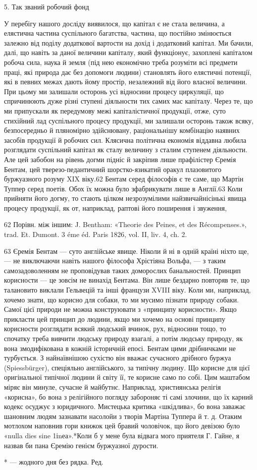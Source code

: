 5. Так званий робочий фонд

У перебігу нашого досліду виявилося, що капітал є не стала
величина, а елястична частина суспільного багатства, частина,
що постійно змінюється залежно від поділу додаткової вартости
на дохід і додатковий капітал. Ми бачили, далі, що навіть за
даної величини капіталу, який функціонує, захоплені капіталом
робоча сила, наука й земля (під нею економічно треба розуміти
всі предмети праці, які природа дає без допомоги людини) становлять
його елястичні потенції, які в певних межах дають йому
простір, незалежний від його власної величини. При цьому ми
залишали осторонь усі відносини процесу циркуляції, що спричинюють
дуже різні ступені діяльности тих самих мас капіталу.
Через те, що ми припускали як передумову межі капіталістичної
продукції, отже, суто стихійний лад суспільного процесу продукції,
ми залишали осторонь також всяку, безпосередньо й пляномірно
здійснювану, раціональнішу комбінацію наявних засобів
продукції й робочих сил. Клясична політична економія віддавна
любила розглядати суспільний капітал як сталу величину
з сталим ступенем діяльности. Але цей забобон на рівень догми
підніс й закріпив лише прафілістер Єремія Бентам, цей тверезо-педантичний
шорстко-язикатий оракул плазовитого буржуазного
розуму XIX віку.62 Бентам серед філософів є те
саме, що Мартін Туппер серед поетів. Обох їх можна було
зфабрикувати лише в Англії.63 Коли прийняти його догму, то
стають цілком незрозумілими найзвичайнісінькі явища процесу
продукції, як от, наприклад, раптові його поширення і звуження,

62 Порівн. між іншим: J. Bentham: «Theorie des Peines, et des Récompenses.»,
trad. Et. Dumont. 3 éme éd. Paris 1826, vol. II, liv. 4, ch. 2.

63 Єремія Бентам — суто англійське явище. Ніколи й ні в одній
країні ніхто ще, — не виключаючи навіть нашого філософа Хрістіяна
Вольфа, — з таким самозадоволенням не проповідував таких доморослих
банальностей. Принцип корисности — це зовсім не винахід Бентама.
Він лише бездарно повторяв те, що талановито виклали Гельвецій та
інші французи XVIII віку. Коли ми, наприклад, хочемо знати, що корисно
для собаки, то ми мусимо пізнати природу собаки. Самої цієї природи
не можна конструювати з «принципу корисности». Якщо прикласти
цей принцип до людини, якщо ми хочемо на основі принципу корисности
розглядати всякий людський вчинок, рух, відносини тощо,
то спочатку треба вивчити людську природу взагалі, а потім людську
природу, як вона змодифікована в кожній історичній епосі. Бентам цими
дрібничками не турбується. З найнаївнішою сухістю він вважає сучасного
дрібного буржуа (Spiessbürger), спеціяльно англійського, за типічну
людину. Що корисне для цієї оригінальної типічної людини й світу її,
те корисне само по собі. Цим маштабом міряє він минуле, сучасне й майбутнє.
Наприклад, християнська релігія «корисна», бо вона з релігійного
погляду забороняє ті самі злочини, що їх карний кодекс осуджує з
юридичного. Мистецька критика «шкідлива», бо вона заважає шановним
людям зазнавати насолойи з творів Мартіна Туппера й т. д. Отаким мотлохом
наповнив гори книжок цей бравий чоловічок, що його девізою було
«nulla dies sine 1іnеа».*Коли б у мене була відвага мого приятеля Г. Гайне,
я назвав би пана Єремію генієм буржуазної дурости.

* — жодного дня без рядка. Ред.
